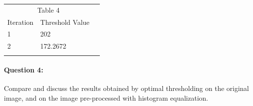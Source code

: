 \documentclass[12pt, letter]{article}
\begin{document}
\begin{center}
\begin{tabular}{llr}  
\toprule
\multicolumn{2}{c}{Table 4} \\
\cmidrule(r){1-2}
Iteration   & Threshold Value \\
\midrule
1 & 202 \\
2 & 172.2672 \\

\bottomrule
\label{table:q2-2}
\end{tabular}    
\end{center}

\paragraph{Question 4: } Compare and discuss the results obtained by optimal thresholding on the original image, and on the image pre-processed with histogram equalization.
\end{document}
